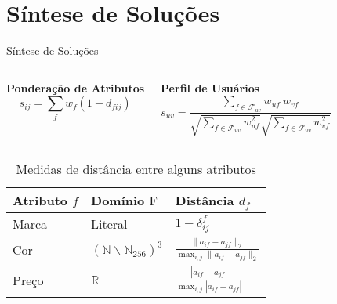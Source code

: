 \section[Síntese de Soluções]{Síntese de Soluções}
\begin{frame}{Síntese de Soluções}
\begin{columns}[t]
\textbf{Ponderação de Atributos}
$$
    s_{ij} = \sum_{f}{w_{f} \left(1-d_{fij}\right)}
$$

\textbf{Perfil de Usuários}
$$
    s_{uv} = \frac{\sum\limits_{f \in \mathcal{F}_{uv}}{w_{uf}~w_{vf}}}{\sqrt{\sum\limits_{f \in \mathcal{F}_{uv}
    }w_{uf}^2} \sqrt{\sum\limits_{f \in \mathcal{F}_{uv}}w_{vf}^2}} 
$$
\end{columns}


\begin{table}[hp]
\begin{center}
    \caption{Medidas de distância entre alguns atributos}
    \label{tab:medidas-distancia}
    \begin{tabular}{  | p{3cm} | p{3cm} | p{3cm} | } 
    \hline
    \textbf{Atributo} $f$ & \textbf{Domínio} $\mathrm{F}$ & \textbf{Distância} $d_f$ \\ \hline
    Marca & Literal & $1-\delta^f_{ij}$ \\ \hline    
    Cor & $\left(\mathbb{N}\backslash \mathbb{N}_{256}\right)^3$  & $ \frac{\lVert a_{if}-a_{jf} \rVert_2}{\max_{i,j}{\lVert a_{if}-a_{jf} \rVert_2}} $ \\ \hline
    Preço & $\mathbb{R}$ & $ \frac{\left| a_{if}-a_{jf} \right|}{\max_{i,j}{\left| a_{if}-a_{jf} \right|}} $ \\ \hline
    \end{tabular}
\end{center}
\end{table}
\end{frame}




